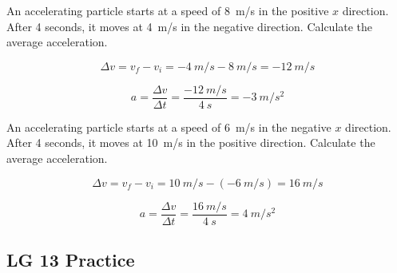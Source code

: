 \documentclass[answers]{exam}
\begin{document}
\begin{questions}
\question
An accelerating particle starts at a speed of \SI{8}{m/s} in the positive $x$ direction. After 4 seconds, it moves at \SI{4}{m/s} in the negative direction. Calculate the average acceleration.

\begin{solution}
\begin{equation*}
    \Delta v = v_f - v_i = -\SI{4}{m/s} - \SI{8}{m/s} = -\SI{12}{m/s}
\end{equation*}

\begin{equation*}
    a = \frac{\Delta v}{\Delta t} = \frac{\SI{-12}{m/s}}{\SI{4}{s}} = \boxed{\SI{-3}{m/s^2}}
\end{equation*}
\end{solution}

\question
An accelerating particle starts at a speed of \SI{6}{m/s} in the negative $x$ direction. After 4 seconds, it moves at \SI{10}{m/s} in the positive direction. Calculate the average acceleration.

\begin{solution}
\begin{equation*}
    \Delta v = v_f - v_i = \SI{10}{m/s} - (-\SI{6}{m/s}) = \SI{16}{m/s}
\end{equation*}

\begin{equation*}
    a = \frac{\Delta v}{\Delta t} = \frac{\SI{16}{m/s}}{\SI{4}{s}} = \boxed{\SI{4}{m/s^2}}
\end{equation*}
\end{solution}
\end{questions}

\clearpage

\subsection*{LG 13 Practice}
\end{document}
